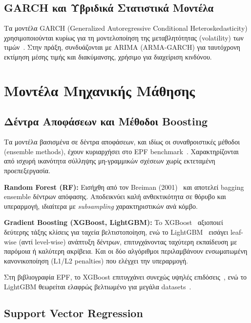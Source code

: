 \subsection{GARCH και Υβριδικά Στατιστικά Μοντέλα}

Τα μοντέλα GARCH (Generalized Autoregressive Conditional Heteroskedasticity) χρησιμοποιούνται κυρίως
για τη μοντελοποίηση της μεταβλητότητας (volatility) των τιμών~\cite{weron2014electricity}. Στην
πράξη, συνδυάζονται με ARIMA (ARMA-GARCH) για ταυτόχρονη εκτίμηση μέσης τιμής και διακύμανσης,
χρήσιμο για διαχείριση κινδύνου.


\section{Μοντέλα Μηχανικής Μάθησης}
\label{sec:ml_models}

\subsection{Δέντρα Αποφάσεων και Μέθοδοι Boosting}

Τα μοντέλα βασισμένα σε δέντρα αποφάσεων, και ιδίως οι συναθροιστικές μέθοδοι
(ensemble methods), έχουν κυριαρχήσει στο EPF benchmark~\cite{lago2021}. Χαρακτηρίζονται από ισχυρή
ικανότητα σύλληψης μη-γραμμικών σχέσεων χωρίς εκτεταμένη προεπεξεργασία.

\textbf{Random Forest (RF):} Εισήχθη από τον Breiman (2001)~\cite{breiman2001rf} και αποτελεί
bagging ensemble δέντρων απόφασης. Αποδεικνύει καλή ανθεκτικότητα σε θόρυβο και υπεραρμογή,
ιδιαίτερα με \textit{subsampling} χαρακτηριστικών ανά κόμβο.

\textbf{Gradient Boosting (XGBoost, LightGBM):} To XGBoost~\cite{chen2016xgboost} αξιοποιεί
δεύτερης τάξης κλίσεις για ταχεία βελτιστοποίηση, ενώ το LightGBM~\cite{ke2017lgbm} εισάγει
leaf-wise (αντί level-wise) ανάπτυξη δέντρων, επιτυγχάνοντας ταχύτερη εκπαίδευση με παρόμοια ή
καλύτερη ακρίβεια. Και οι δύο αλγόριθμοι περιλαμβάνουν ενσωματωμένη κανονικοποίηση (L1/L2 penalties)
που ελέγχει την υπεραρμογή.

Στη βιβλιογραφία EPF, το XGBoost επιτυγχάνει συνεχώς υψηλές επιδόσεις~\cite{lago2021,kanousis2025},
ενώ το LightGBM θεωρείται ελαφρώς βελτιωμένο για μεγάλα datasets~\cite{ke2017lgbm}.

\subsection{Support Vector Regression}


